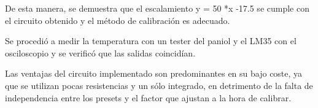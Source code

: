 \documentclass[../../main.tex]{subfiles}
\begin{document}
De esta manera, se demuestra que el escalamiento y = 50 *x -17.5 se cumple con el circuito obtenido y el método de calibración es adecuado. \par
Se procedió a medir la temperatura con un tester del paniol y el LM35 con el osciloscopio y se verificó que las salidas coincidían.\par
Las ventajas del circuito implementado son predominantes en su bajo coste, ya que se utilizan pocas resistencias y un sólo integrado, en detrimento de la falta de independencia entre los presets y el factor que ajustan a la hora de calibrar. 
\end{document}
